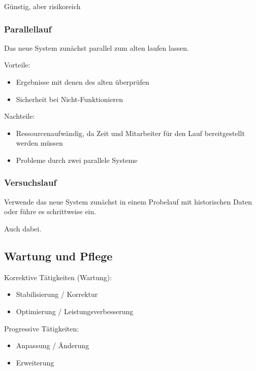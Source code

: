 Günstig, aber risikoreich

\subsubsection{Parallellauf}
Das neue System zunächst parallel zum alten laufen lassen.

Vorteile:
\begin{itemize}
    \item Ergebnisse mit denen des alten überprüfen
    \item Sicherheit bei Nicht-Funktionieren
\end{itemize}

Nachteile:
\begin{itemize}
    \item Ressourcenaufwändig, da Zeit und Mitarbeiter für den Lauf bereitgestellt werden müssen
    \item Probleme durch zwei parallele Systeme
\end{itemize}

\subsubsection{Versuchslauf}
Verwende das neue System zunächst in einem Probelauf mit historischen Daten oder führe es schrittweise ein.

Auch dabei.

\subsection{Wartung und Pflege}
Korrektive Tätigkeiten (Wartung):
\begin{itemize}
    \item Stabilisierung / Korrektur
    \item Optimierung / Leistungsverbesserung
\end{itemize}

Progressive Tätigkeiten:
\begin{itemize}
    \item Anpassung / Änderung
    \item Erweiterung
\end{itemize}